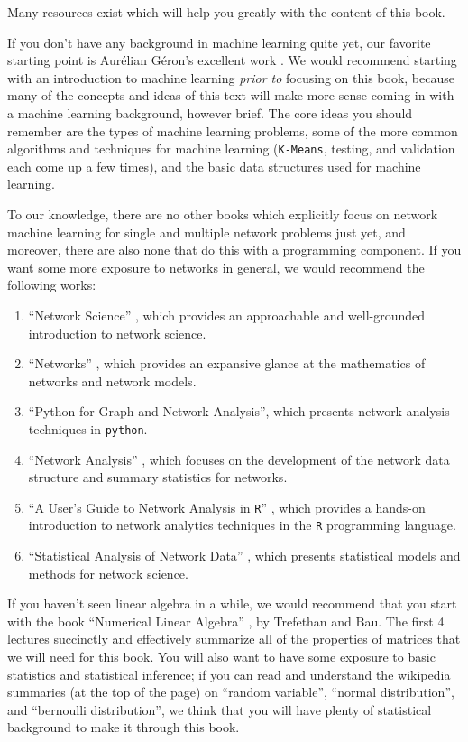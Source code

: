 Many resources exist which will help you greatly with the content of this book. 

If you don't have any background in machine learning quite yet, our favorite starting point is Aur\'elian G\'eron's excellent work \cite{Geron2017Mar}. We would recommend starting with an introduction to machine learning \textit{prior to} focusing on this book, because many of the concepts and ideas of this text will make more sense coming in with a machine learning background, however brief. The core ideas you should remember are the types of machine learning problems, some of the more common algorithms and techniques for machine learning (\texttt{K-Means}, testing, and validation each come up a few times), and the basic data structures used for machine learning.

To our knowledge, there are no other books which explicitly focus on network machine learning for single and multiple network problems just yet, and moreover, there are also none that do this with a programming component. If you want some more exposure to networks in general, we would recommend the following works:
\begin{enumerate}
    \item ``Network Science'' \cite{Barabasi2016Aug}, which provides an approachable and well-grounded introduction to network science.
    \item ``Networks'' \cite{Newman2018Sep}, which provides an expansive glance at the mathematics of networks and network models.
    \item ``Python for Graph and Network Analysis''\cite{AlTaie2017}, which presents network analysis techniques in \texttt{python}.
    \item ``Network Analysis'' \cite{Brandes2005}, which focuses on the development of the network data structure and summary statistics for networks.
    \item ``A User's Guide to Network Analysis in \texttt{R}'' \cite{Luke2015}, which provides a hands-on introduction to network analytics techniques in the \texttt{R} programming language.
    \item ``Statistical Analysis of Network Data'' \cite{Kolaczyk2009}, which presents statistical models and methods for network science.
\end{enumerate}

If you haven't seen linear algebra in a while, we would recommend that you start with the book ``Numerical Linear Algebra'' \citep{Trefethen1997}, by Trefethan and Bau. The first 4 lectures succinctly and effectively summarize all of the properties of matrices that we will need for this book. You will also want to have some exposure to basic statistics and statistical inference; if you can read and understand the wikipedia summaries (at the top of the page) on ``random variable'', ``normal distribution'', and ``bernoulli distribution'', we think that you will have plenty of statistical background to make it through this book. 

